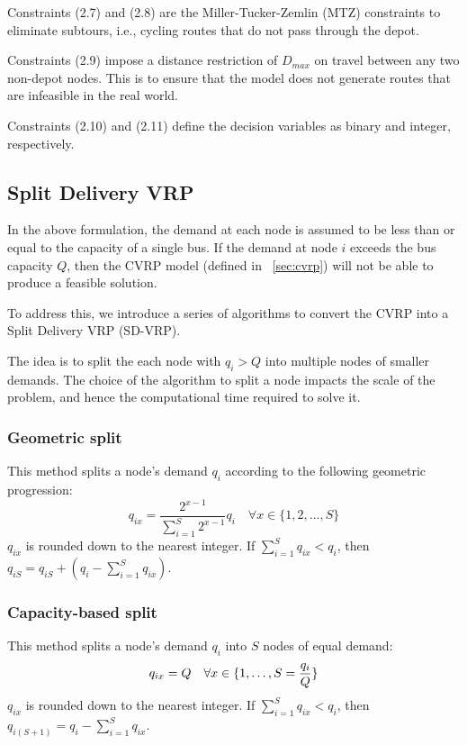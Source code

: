 \documentclass[12pt]{article}
\begin{document}
Constraints (2.7) and (2.8) are the Miller-Tucker-Zemlin (MTZ) constraints to eliminate subtours,
i.e., cycling routes that do not pass through the depot.

Constraints (2.9) impose a distance restriction of $D_{max}$ on travel between any two non-depot nodes.
This is to ensure that the model does not generate routes that are infeasible in the real world.

Constraints (2.10) and (2.11) define the decision variables as binary and integer, respectively.

\subsection{Split Delivery VRP}
In the above formulation, the demand at each node is assumed to be less than or equal to the capacity of a single bus.
If the demand at node $i$ exceeds the bus capacity $Q$, then the CVRP model (defined in ~\autoref{sec:cvrp}) will not be able to produce a feasible solution.

To address this, we introduce a series of algorithms to convert the CVRP into a Split Delivery VRP (SD-VRP).

The idea is to split the each node with $q_i > Q$ into multiple nodes of smaller demands. The choice of the algorithm to split a node impacts the scale of the problem, and hence the computational time required to solve it.

\subsubsection{Geometric split}
This method splits a node's demand $q_i$ according to the following geometric progression:
\begin{equation}
    q_{ix} = \frac{2^{x-1}}{\sum_{i=1}^{S} 2^{x-1}} q_{i} \quad \forall x \in \{1, 2, ..., S\}
\end{equation}
$q_{ix}$ is rounded down to the nearest integer. If $\sum_{i=1}^{S} q_{ix} < q_{i}$, then $q_{iS} = q_{iS} + (q_{i} - \sum_{i=1}^{S} q_{ix})$.

\subsubsection{Capacity-based split}
This method splits a node's demand $q_i$ into $S$ nodes of equal demand:
\begin{equation}
    q_{ix} = Q  \quad \forall x \in \{1, \dots, S = \frac{q_{i}}{Q}\} \\
\end{equation}
$q_{ix}$ is rounded down to the nearest integer. If $\sum_{i=1}^{S} q_{ix} < q_{i}$, then $q_{i(S+1)} = q_{i} - \sum_{i=1}^{S} q_{ix}$.
\end{document}
